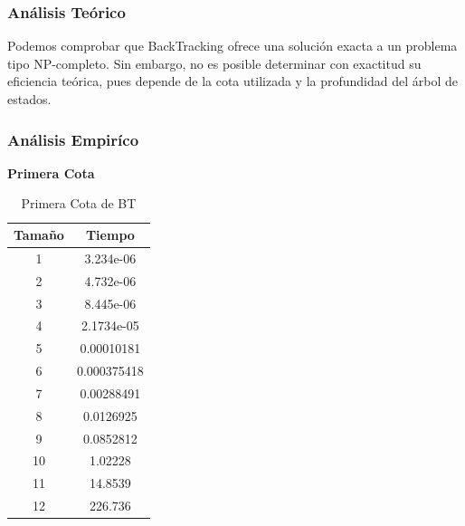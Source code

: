 \documentclass[a4paper,12pt,twoside]{article} %
\begin{document}
\newpage

\subsubsection{Análisis Teórico}

Podemos comprobar que BackTracking ofrece una solución exacta a un problema tipo NP-completo. Sin embargo, no es posible determinar con exactitud su eficiencia teórica, pues depende de la cota utilizada y la profundidad del árbol de estados.\\
\newpage

\subsubsection{Análisis Empiríco}
\vspace{0.5cm}

\textbf{Primera Cota}

\begin{table}[h]
    \begin{center}
	\begin{tabular}{|c|c|}
		\hline
		Tamaño & Tiempo \\
		\hline
            1 & 3.234e-06 \\
            2 & 4.732e-06 \\
            3 & 8.445e-06 \\
            4 & 2.1734e-05 \\
            5 & 0.00010181 \\
            6 & 0.000375418 \\
            7 & 0.00288491 \\
            8 & 0.0126925 \\
            9 & 0.0852812 \\
            10 & 1.02228 \\
            11 & 14.8539 \\
            12 & 226.736 \\
		\hline
	\end{tabular}
    \end{center}
    \caption{Primera Cota de BT}
\end{table}
\end{document}
